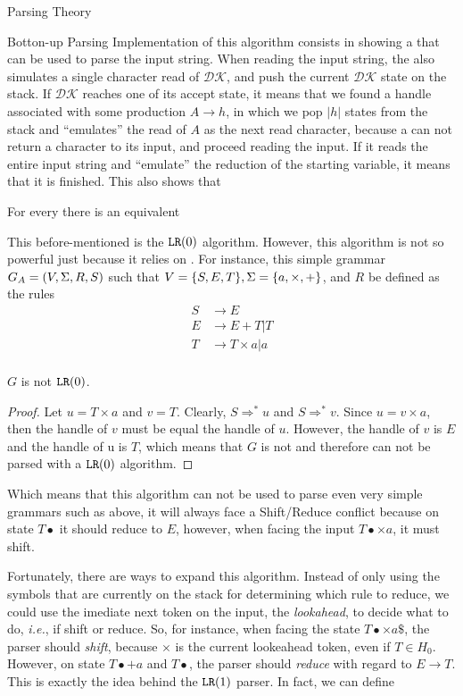 \begin{section}{Parsing Theory}
\begin{subsection}{Botton-up Parsing}
Implementation of this algorithm consists in showing a \DPDA that
can be used to parse the input string. When reading the input string,
the \DPDA also simulates a single character read of $\mathcal{DK}$,
and push the current $\mathcal{DK}$ state on the stack. If
$\mathcal{DK}$ reaches one of its accept state, it means that we
found a handle associated with some production $A \rightarrow h$,
in which we pop $|h|$ states from the \DPDA stack and ``emulates''
the read of $A$ as the next read character, because a \DPDA can
not return a character to its input, and proceed reading the input.
If it reads the entire input string and ``emulate'' the reduction
of the starting variable, it means that it is finished. This also
shows that
\begin{lemma}
For every \DCFG there is an equivalent \DPDA
\end{lemma}

This before-mentioned \DPDA is the $\texttt{LR}(0)$ algorithm.
However, this algorithm is not so powerful just because it relies on
\DCFG. For instance, this simple grammar $G_A = (V, \Sigma, R, S)$ such that
$V = \{S, E, T\}, \Sigma = \{a, \times, +\}$, and $R$ be defined as the rules
\begin{align}
S &\rightarrow E \\
E &\rightarrow E + T | T \\
T &\rightarrow T \times a | a \\
\end{align}

\begin{lemma}\label{shift_reduce}
	$G$ is not $\texttt{LR}(0)$.
\end{lemma}
\begin{proof}
	Let $u = T \times a$ and $v = T$. Clearly, $S \Rightarrow^* u$ and
	$S \Rightarrow^*v$. Since $u = v \times a$, then the handle of
	$v$ must be equal the handle of $u$. However, the handle of $v$
	is $E$ and the handle of u is $T$, which means that $G$ is not
	 and therefore can not be parsed with a $\texttt{LR}(0)$
	algorithm.
\end{proof}

Which means that this algorithm can not be used to parse even very simple
grammars such as above, it will always face a Shift/Reduce conflict
because on state $T\bullet$ it should reduce to $E$, however, when
facing the input $T\bullet \times a$, it must shift.

Fortunately, there are ways to expand this algorithm.
Instead of only using the symbols that are currently on the stack for
determining which rule to reduce, we could use the imediate next
token on the input, the \textit{lookahead}, to decide what to do, \textit{i.e.},
if shift or reduce. So, for instance, when facing the state
$T\bullet \times a\$$, the parser should \textit{shift}, because
$\times$ is the current lookeahead token, even if $T \in H_0$.
However, on state $T\bullet + a$ and $T\bullet$, the parser should
\textit{reduce} with regard to $E \rightarrow T$. This is exactly the
idea behind the $\texttt{LR}(1)$ parser. In fact, we can define


\end{subsection}
\end{section}
